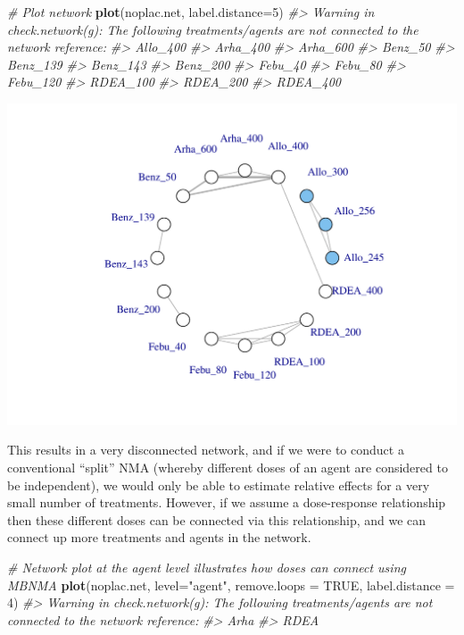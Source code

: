 \documentclass[]{article}
\newenvironment{Shaded}{\begin{snugshade}}{\end{snugshade}}
\newcommand{\CommentTok}[1]{\textcolor[rgb]{0.56,0.35,0.01}{\textit{#1}}}
\newcommand{\DataTypeTok}[1]{\textcolor[rgb]{0.13,0.29,0.53}{#1}}
\newcommand{\DecValTok}[1]{\textcolor[rgb]{0.00,0.00,0.81}{#1}}
\newcommand{\KeywordTok}[1]{\textcolor[rgb]{0.13,0.29,0.53}{\textbf{#1}}}
\newcommand{\NormalTok}[1]{#1}
\newcommand{\OtherTok}[1]{\textcolor[rgb]{0.56,0.35,0.01}{#1}}
\newcommand{\StringTok}[1]{\textcolor[rgb]{0.31,0.60,0.02}{#1}}
\begin{document}
\begin{Shaded}
\begin{Highlighting}[]
\CommentTok{# Plot network}
\KeywordTok{plot}\NormalTok{(noplac.net, }\DataTypeTok{label.distance=}\DecValTok{5}\NormalTok{)}
\CommentTok{#> Warning in check.network(g): The following treatments/agents are not connected to the network reference:}
\CommentTok{#> Allo_400}
\CommentTok{#> Arha_400}
\CommentTok{#> Arha_600}
\CommentTok{#> Benz_50}
\CommentTok{#> Benz_139}
\CommentTok{#> Benz_143}
\CommentTok{#> Benz_200}
\CommentTok{#> Febu_40}
\CommentTok{#> Febu_80}
\CommentTok{#> Febu_120}
\CommentTok{#> RDEA_100}
\CommentTok{#> RDEA_200}
\CommentTok{#> RDEA_400}
\end{Highlighting}
\end{Shaded}

\includegraphics{mbnmadose_files/figure-latex/unnamed-chunk-28-1.pdf}

This results in a very disconnected network, and if we were to conduct a
conventional ``split'' NMA (whereby different doses of an agent are
considered to be independent), we would only be able to estimate
relative effects for a very small number of treatments. However, if we
assume a dose-response relationship then these different doses can be
connected via this relationship, and we can connect up more treatments
and agents in the network.

\begin{Shaded}
\begin{Highlighting}[]
\CommentTok{# Network plot at the agent level illustrates how doses can connect using MBNMA}
\KeywordTok{plot}\NormalTok{(noplac.net, }\DataTypeTok{level=}\StringTok{"agent"}\NormalTok{, }\DataTypeTok{remove.loops =} \OtherTok{TRUE}\NormalTok{, }\DataTypeTok{label.distance =} \DecValTok{4}\NormalTok{)}
\CommentTok{#> Warning in check.network(g): The following treatments/agents are not connected to the network reference:}
\CommentTok{#> Arha}
\CommentTok{#> RDEA}
\end{Highlighting}
\end{Shaded}
\end{document}

